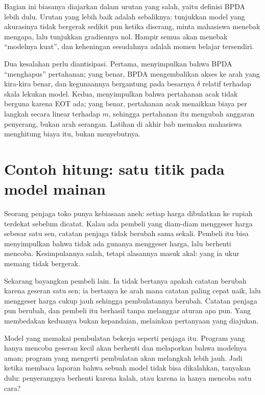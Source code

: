 
\begin{untukdosen}
Bagian ini biasanya diajarkan dalam urutan yang salah, yaitu definisi BPDA lebih dulu.
Urutan yang lebih baik adalah sebaliknya: tunjukkan model yang akurasinya tidak bergerak
sedikit pun ketika diserang, minta mahasiswa menebak mengapa, lalu tunjukkan gradiennya
nol. Hampir semua akan menebak ``modelnya kuat'', dan keheningan sesudahnya adalah momen
belajar tersendiri.

Dua kesalahan perlu diantisipasi. Pertama, menyimpulkan bahwa BPDA ``menghapus''
pertahanan; yang benar, BPDA mengembalikan akses ke arah yang kira-kira benar, dan
kegunaannya bergantung pada besarnya $\delta$ relatif terhadap skala lekukan model.
Kedua, menyimpulkan bahwa pertahanan acak tidak berguna karena EOT ada; yang benar,
pertahanan acak menaikkan biaya per langkah secara linear terhadap $m$, sehingga
pertahanan itu mengubah anggaran penyerang, bukan arah serangan. Latihan di akhir bab
memaksa mahasiswa menghitung biaya itu, bukan menyebutnya.
\end{untukdosen}

\section{Contoh hitung: satu titik pada model mainan}

\begin{untukanak}
Seorang penjaga toko punya kebiasaan aneh: setiap harga dibulatkan ke rupiah terdekat
sebelum dicatat. Kalau ada pembeli yang diam-diam menggeser harga sebesar satu sen,
catatan penjaga tidak berubah sama sekali. Pembeli itu bisa menyimpulkan bahwa tidak
ada gunanya menggeser harga, lalu berhenti mencoba. Kesimpulannya salah, tetapi
alasannya masuk akal: yang ia ukur memang tidak bergerak.

Sekarang bayangkan pembeli lain. Ia tidak bertanya apakah catatan berubah karena
geseran satu sen; ia bertanya ke arah mana catatan paling cepat naik, lalu menggeser
harga cukup jauh sehingga pembulatannya berubah. Catatan penjaga pun berubah, dan
pembeli itu berhasil tanpa melanggar aturan apa pun. Yang membedakan keduanya bukan
kepandaian, melainkan pertanyaan yang diajukan.

Model yang memakai pembulatan bekerja seperti penjaga itu. Program yang hanya mencoba
geseran kecil akan berhenti dan melaporkan bahwa modelnya aman; program yang mengerti
pembulatan akan melangkah lebih jauh. Jadi ketika membaca laporan bahwa sebuah model
tidak bisa dikalahkan, tanyakan dulu: penyerangnya berhenti karena kalah, atau karena ia
hanya mencoba satu cara?
\end{untukanak}

